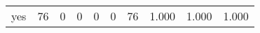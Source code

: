 \begin{longtable}{lp{2.0cm}p{2.0cm}p{2.0cm}p{2.0cm}p{2.0cm}p{2.0cm}p{2.0cm}p{2.0cm}p{2.0cm}}
yes       &                     76 &                                             0 &                                            0 &                                           0 &                                            0 &                                         76 &                                1.000 &                                  1.000 &                                1.000 \\
\end{longtable}
